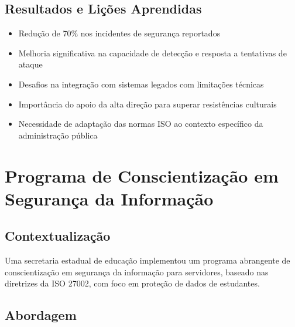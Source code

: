 \documentclass[12pt,a4paper]{report}
\begin{document}
\subsection{Resultados e Lições Aprendidas}

\begin{itemize}
  \item Redução de 70\% nos incidentes de segurança reportados
  \item Melhoria significativa na capacidade de detecção e resposta a tentativas de ataque
  \item Desafios na integração com sistemas legados com limitações técnicas
  \item Importância do apoio da alta direção para superar resistências culturais
  \item Necessidade de adaptação das normas ISO ao contexto específico da administração pública
\end{itemize}

\section{Programa de Conscientização em Segurança da Informação}

\subsection{Contextualização}

Uma secretaria estadual de educação implementou um programa abrangente de conscientização em segurança da informação para servidores, baseado nas diretrizes da ISO 27002, com foco em proteção de dados de estudantes.

\subsection{Abordagem}
\end{document}
